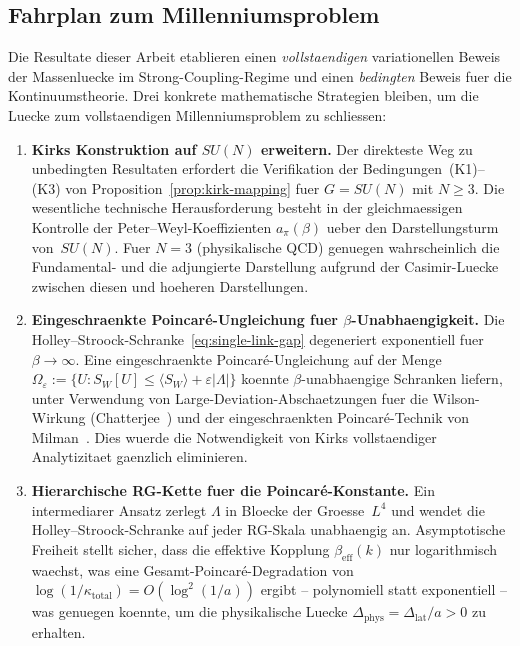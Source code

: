 \documentclass[12pt,a4paper]{article}
\theoremstyle{definition}
\theoremstyle{plain}
\theoremstyle{remark}
\begin{document}
\subsection{Fahrplan zum Millenniumsproblem}

Die Resultate dieser Arbeit etablieren einen \emph{vollstaendigen} variationellen Beweis
der Massenluecke im Strong-Coupling-Regime und einen \emph{bedingten}
Beweis fuer die Kontinuumstheorie. Drei konkrete mathematische Strategien
bleiben, um die Luecke zum vollstaendigen Millenniumsproblem zu schliessen:

\begin{enumerate}
    \item \textbf{Kirks Konstruktion auf $SU(N)$ erweitern.}
    Der direkteste Weg zu unbedingten Resultaten erfordert die Verifikation
    der Bedingungen~(K1)--(K3) von Proposition~\ref{prop:kirk-mapping} fuer
    $G = SU(N)$ mit $N \geq 3$. Die wesentliche technische Herausforderung besteht
    in der gleichmaessigen Kontrolle der Peter--Weyl-Koeffizienten $a_\pi(\beta)$
    ueber den Darstellungsturm von~$SU(N)$. Fuer $N = 3$ (physikalische
    QCD) genuegen wahrscheinlich die Fundamental- und die adjungierte Darstellung
    aufgrund der Casimir-Luecke zwischen diesen und hoeheren Darstellungen.

    \item \textbf{Eingeschraenkte Poincar\'e-Ungleichung fuer $\beta$-Unabhaengigkeit.}
    Die Holley--Stroock-Schranke~\eqref{eq:single-link-gap} degeneriert
    exponentiell fuer $\beta \to \infty$. Eine eingeschraenkte Poincar\'e-Ungleichung
    auf der Menge $\Omega_\varepsilon := \{U : S_W[U] \leq
    \langle S_W\rangle + \varepsilon|\Lambda|\}$ koennte
    $\beta$-unabhaengige Schranken liefern, unter Verwendung von
    Large-Deviation-Abschaetzungen fuer die Wilson-Wirkung
    (Chatterjee~\cite{Chatterjee2016}) und der eingeschraenkten
    Poincar\'e-Technik von Milman~\cite{Milman2009}. Dies wuerde die
    Notwendigkeit von Kirks vollstaendiger Analytizitaet gaenzlich eliminieren.

    \item \textbf{Hierarchische RG-Kette fuer die Poincar\'e-Konstante.}
    Ein intermediarer Ansatz zerlegt $\Lambda$ in Bloecke der
    Groesse~$L^4$ und wendet die Holley--Stroock-Schranke auf jeder RG-Skala
    unabhaengig an. Asymptotische Freiheit stellt sicher, dass die effektive
    Kopplung $\beta_{\mathrm{eff}}(k)$ nur logarithmisch waechst,
    was eine Gesamt-Poincar\'e-Degradation von
    $\log(1/\kappa_{\mathrm{total}}) = O(\log^2(1/a))$ ergibt -- polynomiell
    statt exponentiell -- was genuegen koennte, um die physikalische
    Luecke $\Delta_{\mathrm{phys}} = \Delta_{\mathrm{lat}}/a > 0$ zu erhalten.
\end{enumerate}
\end{document}
